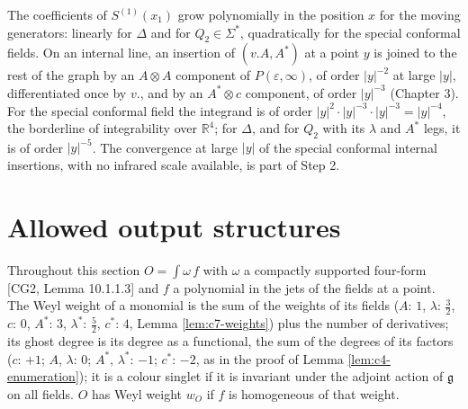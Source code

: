 \begin{remark}
\label{rem:c7-ir}
The coefficients of $S^{(1)}(x_1)$ grow polynomially in the position $x$ for the moving generators: linearly for $\Delta$ and for $Q_2\in\Sigma^*$, quadratically for the special conformal fields. On an internal line, an insertion of $(v.A,A^*)$ at a point $y$ is joined to the rest of the graph by an $A\otimes A$ component of $P(\varepsilon,\infty)$, of order $|y|^{-2}$ at large $|y|$, differentiated once by $v.$, and by an $A^*\otimes c$ component, of order $|y|^{-3}$ (Chapter 3). For the special conformal field the integrand is of order $|y|^2\cdot|y|^{-3}\cdot|y|^{-3}=|y|^{-4}$, the borderline of integrability over $\mathbb R^4$; for $\Delta$, and for $Q_2$ with its $\lambda$ and $A^*$ legs, it is of order $|y|^{-5}$. The convergence at large $|y|$ of the special conformal internal insertions, with no infrared scale available, is part of Step 2.
\end{remark}

\section{Allowed output structures}

Throughout this section $O=\int\omega\,f$ with $\omega$ a compactly supported four-form [CG2, Lemma 10.1.1.3] and $f$ a polynomial in the jets of the fields at a point. The Weyl weight of a monomial is the sum of the weights of its fields ($A$: $1$, $\lambda$: $\tfrac32$, $c$: $0$, $A^*$: $3$, $\lambda^*$: $\tfrac52$, $c^*$: $4$, Lemma \ref{lem:c7-weights}) plus the number of derivatives; its ghost degree is its degree as a functional, the sum of the degrees of its factors ($c$: $+1$; $A$, $\lambda$: $0$; $A^*$, $\lambda^*$: $-1$; $c^*$: $-2$, as in the proof of Lemma \ref{lem:c4-enumeration}); it is a colour singlet if it is invariant under the adjoint action of $\mathfrak g$ on all fields. $O$ has Weyl weight $w_O$ if $f$ is homogeneous of that weight.


